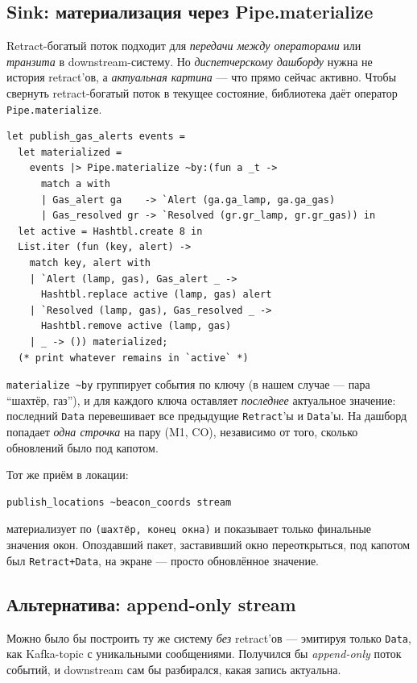 \subsection{Sink: материализация через Pipe.materialize}

Retract-богатый поток подходит для \emph{передачи между операторами}
или \emph{транзита} в downstream-систему. Но \emph{диспетчерскому
дашборду} нужна не история retract'ов, а \emph{актуальная картина}
--- что прямо сейчас активно. Чтобы свернуть retract-богатый поток в
текущее состояние, библиотека даёт оператор \texttt{Pipe.materialize}.

\begin{lstlisting}
let publish_gas_alerts events =
  let materialized =
    events |> Pipe.materialize ~by:(fun a _t ->
      match a with
      | Gas_alert ga    -> `Alert (ga.ga_lamp, ga.ga_gas)
      | Gas_resolved gr -> `Resolved (gr.gr_lamp, gr.gr_gas)) in
  let active = Hashtbl.create 8 in
  List.iter (fun (key, alert) ->
    match key, alert with
    | `Alert (lamp, gas), Gas_alert _ ->
      Hashtbl.replace active (lamp, gas) alert
    | `Resolved (lamp, gas), Gas_resolved _ ->
      Hashtbl.remove active (lamp, gas)
    | _ -> ()) materialized;
  (* print whatever remains in `active` *)
\end{lstlisting}

\texttt{materialize \textasciitilde by} группирует события по ключу
(в нашем случае --- пара ``шахтёр, газ''), и для каждого ключа
оставляет \emph{последнее} актуальное значение: последний
\texttt{Data} перевешивает все предыдущие \texttt{Retract}'ы и
\texttt{Data}'ы. На дашборд попадает \emph{одна строчка} на пару
(M1, CO), независимо от того, сколько обновлений было под капотом.

Тот же приём в локации:

\begin{lstlisting}
publish_locations ~beacon_coords stream
\end{lstlisting}

материализует по \texttt{(шахтёр, конец окна)} и показывает только
финальные значения окон. Опоздавший пакет, заставивший окно
переоткрыться, под капотом был \texttt{Retract+Data}, на экране ---
просто обновлённое значение.

\subsection{Альтернатива: append-only stream}

Можно было бы построить ту же систему \emph{без} retract'ов ---
эмитируя только \texttt{Data}, как Kafka-topic с уникальными
сообщениями. Получился бы \emph{append-only} поток событий, и
downstream сам бы разбирался, какая запись актуальна.

